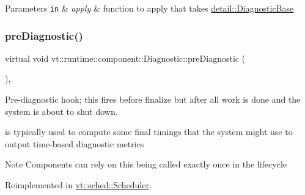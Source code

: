 \begin{DoxyParams}[1]{Parameters}
\mbox{\tt in}  & {\em apply} & function to apply that takes {\ttfamily \hyperlink{structvt_1_1runtime_1_1component_1_1detail_1_1_diagnostic_base}{detail\+::\+Diagnostic\+Base}} \\
\hline
\end{DoxyParams}
\mbox{\label{structvt_1_1runtime_1_1component_1_1_diagnostic_a4e64b5a12ffc1874065aa8b09e6309a9}} 
\subsubsection{\texorpdfstring{pre\+Diagnostic()}{preDiagnostic()}}
{\footnotesize\ttfamily virtual void vt\+::runtime\+::component\+::\+Diagnostic\+::pre\+Diagnostic (\begin{DoxyParamCaption}{ }\end{DoxyParamCaption})\hspace{0.3cm}{\ttfamily [inline]}, {\ttfamily [virtual]}}



Pre-\/diagnostic hook; this fires before finalize but after all work is done and the system is about to shut down. 

is typically used to compute some final timings that the system might use to output time-\/based diagnostic metrics

\begin{DoxyNote}{Note}
Components can rely on this being called exactly once in the lifecycle 
\end{DoxyNote}


Reimplemented in \hyperlink{structvt_1_1sched_1_1_scheduler_a42835a58f541dd65cecd4d393fe78a81}{vt\+::sched\+::\+Scheduler}.

\mbox{\label{structvt_1_1runtime_1_1component_1_1_diagnostic_aa2cd54632710e7cdf1b20dfb676c752c}} 
